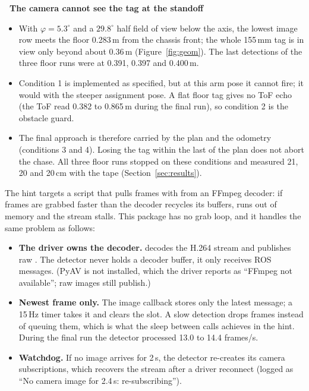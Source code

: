 \begin{warnbox}
\small\textbf{\color{warn}\faEyeSlash\ The camera cannot see the tag at the standoff}
\begin{itemize}
  \item With $\varphi=5.3^\circ$ and a $29.8^\circ$ half field of view below the axis, the lowest image row meets the floor
        0.283\,m from the chassis front; the whole 155\,mm tag is in view only beyond about 0.36\,m
        (Figure~\ref{fig:geom}). The last detections of the three floor runs were at 0.391, 0.397 and 0.400\,m.
  \item Condition 1 is implemented as specified, but at this arm pose it cannot fire; it would with the steeper
        assignment pose. A flat floor tag gives no ToF echo (the ToF read 0.382 to 0.865\,m during the final run), so
        condition 2 is the obstacle guard.
  \item The final approach is therefore carried by the plan and the odometry (conditions 3 and 4). Losing the tag
        within the last  of the plan does not abort the chase. All three floor runs stopped on these
        conditions and measured 21, 20 and 20\,cm with the tape (Section~\ref{sec:results}).
\end{itemize}
\end{warnbox}

The hint targets a script that pulls frames with  from an FFmpeg decoder: if frames are grabbed
faster than the decoder recycles its buffers,  runs out of memory and the stream stalls.
This package has no grab loop, and it handles the same problem as follows:
\begin{itemize}
  \item \textbf{The driver owns the decoder.}  decodes the H.264 stream and publishes raw
        . The detector never holds a decoder buffer, it only receives ROS messages.
        (PyAV is not installed, which the driver reports as ``FFmpeg not available''; raw images still publish.)
  \item \textbf{Newest frame only.} The image callback stores only the latest message; a 15\,Hz timer takes it and
        clears the slot. A slow detection drops frames instead of queuing them, which is what the sleep between
         calls achieves in the hint. During the final run the detector processed 13.0 to 14.4 frames/s.
  \item \textbf{Watchdog.} If no image arrives for 2\,s, the detector re-creates its camera subscriptions, which recovers
        the stream after a driver reconnect (logged as ``No camera image for 2.4\,s: re-subscribing'').
\end{itemize}
